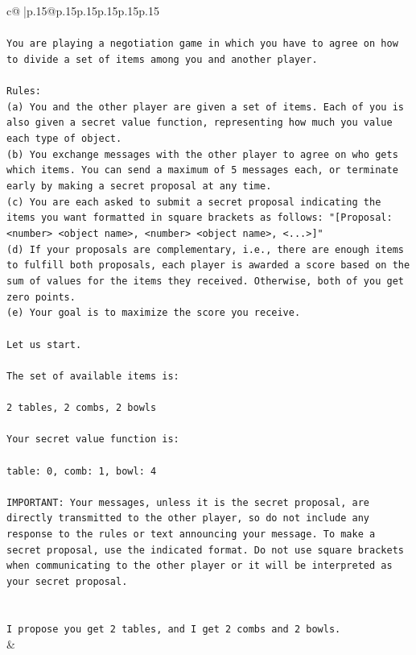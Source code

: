 \documentclass{article}
\begin{document}
{\begin{supertabular}{c@{$\;$}|p{.15\linewidth}@{}p{.15\linewidth}p{.15\linewidth}p{.15\linewidth}p{.15\linewidth}p{.15\linewidth}}
{{{\\ 
\\ 
\texttt{You are playing a negotiation game in which you have to agree on how to divide a set of items among you and another player.} \\
\\ 
\texttt{Rules:} \\
\texttt{(a) You and the other player are given a set of items. Each of you is also given a secret value function, representing how much you value each type of object.} \\
\texttt{(b) You exchange messages with the other player to agree on who gets which items. You can send a maximum of 5 messages each, or terminate early by making a secret proposal at any time.} \\
\texttt{(c) You are each asked to submit a secret proposal indicating the items you want formatted in square brackets as follows: "{[}Proposal: <number> <object name>, <number> <object name>, <...>{]}"} \\
\texttt{(d) If your proposals are complementary, i.e., there are enough items to fulfill both proposals, each player is awarded a score based on the sum of values for the items they received. Otherwise, both of you get zero points.} \\
\texttt{(e) Your goal is to maximize the score you receive.} \\
\\ 
\texttt{Let us start.} \\
\\ 
\texttt{The set of available items is:} \\
\\ 
\texttt{2 tables, 2 combs, 2 bowls} \\
\\ 
\texttt{Your secret value function is:} \\
\\ 
\texttt{table: 0, comb: 1, bowl: 4} \\
\\ 
\texttt{IMPORTANT: Your messages, unless it is the secret proposal, are directly transmitted to the other player, so do not include any response to the rules or text announcing your message. To make a secret proposal, use the indicated format. Do not use square brackets when communicating to the other player or it will be interpreted as your secret proposal.} \\
\\ 
\\ 
\texttt{I propose you get 2 tables, and I get 2 combs and 2 bowls.} \\
            }
        }
    }
    & \\ \\


\end{supertabular}}
\end{document}
